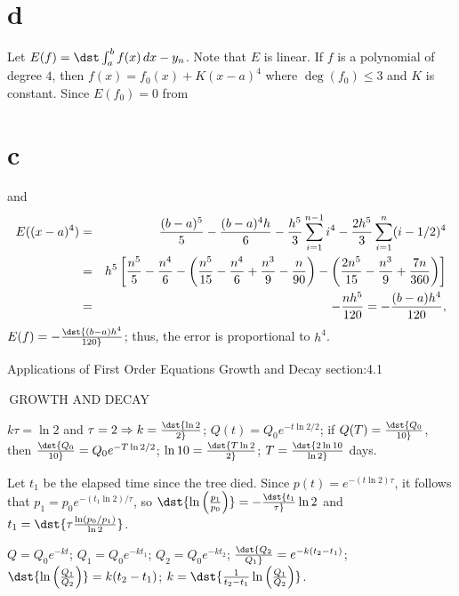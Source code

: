 \documentclass[dvips]{book}
\renewcommand{\exer}[1]{\par\medskip\;\noindent{\color{red}\bf #1.}}
\numberwithin{example}{section}
\numberwithin{equation}{section}
\numberwithin{theorem}{section}
\numberwithin{table}{section}
\numberwithin{figure}{section}
\begin{document}
\part{d}
Let
$E(f)=\dst\int_a^bf(x)\,dx-y_n$. Note that $E$ is linear.
If $f$ is a polynomial of degree $4$, then $f(x)=f_0(x)+K(x-a)^4$
where $\deg(f_0)\le3$ and $K$ is constant. Since
$E(f_0)=0$ from \part{c} and
\begin{eqnarray*}
E((x-a)^4)&=&{(b-a)^5\over5}-{(b-a)^4h\over6}-{h^5\over3}\sum_{i=1}^{n-1}
i^4-{2h^5\over3}\sum_{i=1}^n(i-1/2)^4\\
&=&h^5\left[{n^5\over5}-{n^4\over6}-\left({n^5\over15}
-{n^4\over6}+{n^3\over9}-{n\over90}\right)-\left(
{2n^5\over15}-{n^3\over9}+{7n\over360}\right)\right]\\
&=&-{nh^5\over120}=-{(b-a)h^4\over120},
\end{eqnarray*}
$E(f)=-\dst{(b-a)h^4\over120}$; thus, the error is proportional to
$h^4$.

\newpage
\thispagestyle{empty}

\setcounter{chapter}{4}

{Applications of First Order Equations}
{Growth and Decay}
 {section:4.1}

\renewcommand{\thissection}{\sectiontitle
{\,GROWTH AND DECAY}}
\thissection

\vspace{-20pt}



\exer{4.1.2}
$k\tau=\ln2$ and $\tau=2\Rightarrow k=\dst{\ln2\over2}$;
$Q(t)=Q_0e^{-t\ln2/2}$; if $Q(T)=\dst{Q_0\over10}$, then
$\dst{Q_0\over10}=Q_0e^{-T\ln2/2}$; $\ln10=\dst{T\ln2\over2}$;
$T=\dst{2\ln10\over\ln2}$ days.


\exer{4.1.4}
Let $t_1$ be the elapsed time since the tree died.
Since $p(t)=e^{-(t\ln2)\tau}$, it follows that
$p_1=p_0e^{-(t_1\ln2)/\tau}$, so $\dst{\ln\left(p_1\over p_0\right)}
=-\dst{t_1\over\tau}\ln2$ and
 $t_1=\dst{\tau {\ln(p_0/p_1)\over\ln2}}$.




\exer{4.1.6}
$Q=Q_0e^{-kt}$;
$Q_1=Q_0e^{-kt_1}$;
$Q_2=Q_0e^{-kt_2}$; $\dst{Q_2\over Q_1}=e^{-k(t_2-t_1)}$;
$\dst{\ln\left(Q_1\over Q_2\right)}=k(t_2-t_1)$; $k=\dst{{1\over
t_2-t_1}\ln\left(Q_1\over Q_2\right)}$.
\end{document}
